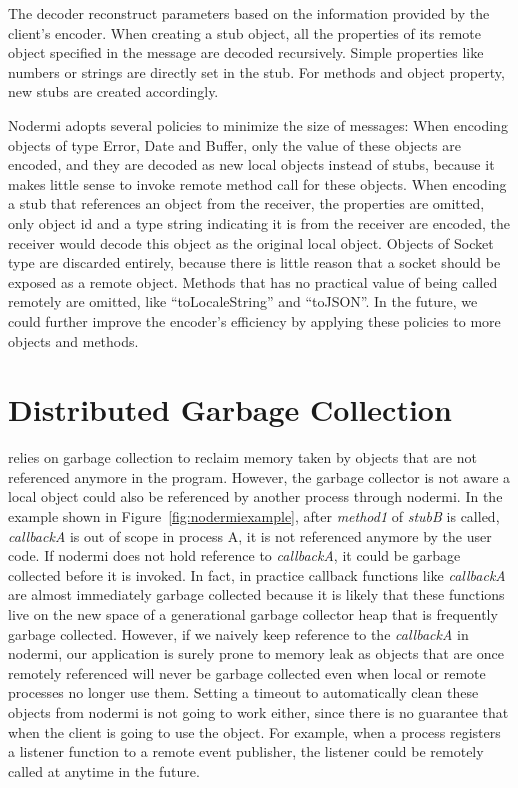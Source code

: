 The decoder reconstruct parameters based on the information 
provided by the client's encoder.
When creating a stub object,
all the properties of its remote object specified in the message 
are decoded recursively.
Simple properties like numbers or strings are directly set in the stub.
For methods and object property, new stubs are created accordingly.

Nodermi adopts several policies to minimize the size of messages:
When encoding objects of type Error, Date and Buffer,
only the value of these objects are encoded,
and they are decoded as new local objects instead of stubs,
because it makes little sense to invoke remote method call for these objects.
When encoding a stub that references an object from the receiver,
the properties are omitted, only object id and a type string indicating 
it is from the receiver are encoded,
the receiver would decode this object as the original local object.
Objects of Socket type are discarded entirely, because
there is little reason that a socket should be exposed as a remote object.
Methods that has no practical value of being called remotely are
omitted, like ``toLocaleString'' and ``toJSON''.
In the future, 
we could further improve the encoder's efficiency 
by applying these policies to more objects and methods.


\section{Distributed Garbage Collection}
\js{} relies on garbage collection to reclaim memory taken by
objects that are not referenced anymore in the program.
However, the garbage collector is not aware a local object
could also be referenced by another process through nodermi.
In the example shown in Figure~\ref{fig:nodermiexample},
after \emph{method1} of \emph{stubB} is called,
\emph{callbackA} is out of scope in process A,
it is not referenced anymore by the user code.
If nodermi does not hold reference to \emph{callbackA},
it could be garbage collected before it is invoked.
In fact, in practice callback functions like \emph{callbackA} are almost
immediately garbage collected because it is likely that these functions
live on the new space of a generational garbage collector heap that is frequently
garbage collected.
However, if we naively keep reference to the \emph{callbackA} in nodermi,
our application is surely prone to memory leak as objects that are once remotely
referenced
will never be garbage collected even when local or remote processes 
no longer use them.
Setting a timeout to automatically clean these objects from nodermi
 is not going to work either,
since there is no guarantee that when the client is going to use the object.
For example,
when a process registers a listener function to a remote event publisher,
the listener could be remotely called at anytime in the future.


